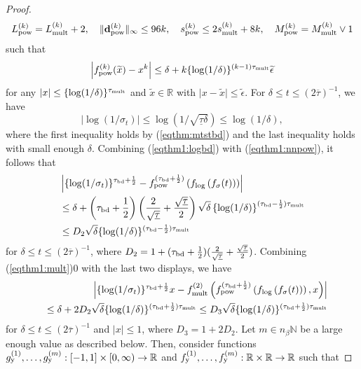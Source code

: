 \documentclass[twoside,11pt]{article}
\newcommand{\bd}{{\bf d}}
\newcommand{\bbR}{{\mathbb R}}
\newcommand{\bbN}{{\mathbb N}}
\newcommand{\be}{\begin{equation}}
\newcommand{\ee}{\end{equation}}
\newcommand{\bean}{\setlength\arraycolsep{1pt}\begin{eqnarray*}}
\newcommand{\eean}{\end{eqnarray*}}
\begin{document}
\begin{proof}
\bean
L_{\rm pow}^{(k)} =  L_{\rm mult}^{(k)} +2, \quad \| \bd_{\rm pow}^{(k)}\|_{\infty} \leq 96k, \quad s_{\rm pow}^{(k)} \leq 2s_{\rm mult}^{(k)} + 8k, \quad M_{\rm pow}^{(k)} =  M_{\rm mult}^{(k)} \vee 1
\eean
such that
\be
\left\vert f_{\rm pow}^{(k)}(\widetilde x) - x^{k} \right\vert \leq \delta + k \{ \log (1/\delta)\}^{(k-1)\tau_{\rm mult}}\widetilde \epsilon
\label{eqthm1:nnpow}
\ee
for any $\vert x \vert \leq \{\log (1/\delta)\}^{\tau_{\rm mult}}$ and $\widetilde x \in \bbR$ with $\vert x - \widetilde x \vert \leq \widetilde \epsilon$.
For $\delta \leq t \leq (2\overline{\tau})^{-1}$, we have
\be
\vert \log (1/\sigma_{t}) \vert \leq \log (1/\sqrt{\underline{\tau} \delta}) \leq \log(1/\delta), \label{eqthm1:logstbd}
\ee
where the first inequality holds by (\ref{eqthm:mtstbd}) and the last inequality holds with small enough $\delta$.
Combining (\ref{eqthm1:logbd}) with (\ref{eqthm1:nnpow}), it follows that
\be \begin{split}
& \left\vert \{ \log(1/\sigma_t)\}^{\tau_{\rm bd}+\frac{1}{2}} -   f_{\rm pow}^{(\tau_{\rm bd}+\frac{1}{2})} \left( f_{\log} \left( f_{\sigma}(t) \right) \right) \right\vert
\\
& \leq \delta + \left(\tau_{\rm bd}+\frac{1}{2} \right)\left(\frac{2}{\sqrt{\underline{\tau}}} + \frac{\sqrt{\underline{\tau}}}{2}   \right) \sqrt{\delta} \left\{ \log(1/\delta) \right\}^{(\tau_{\rm bd}-\frac{1}{2} )\tau_{\rm mult}} 
\\
& \leq D_{2} \sqrt{\delta} \{ \log(1/\delta) \}^{(\tau_{\rm bd}-\frac{1}{2} )\tau_{\rm mult}} \label{eqthm1:nnwj1}
\end{split} \ee
for $\delta \leq t \leq (2\overline{\tau})^{-1}$, where $D_{2} =1 + (\tau_{\rm bd}+\frac{1}{2} )(\frac{2}{\sqrt{\underline{\tau}}} + \frac{\sqrt{\underline{\tau}}}{2}  )$.
Combining (\ref{eqthm1:mult})0 with the last two displays, we have
\bean
&& \left\vert \{ \log(1/\sigma_t)\}^{\tau_{\rm bd}+\frac{1}{2}} x -   f_{\rm mult}^{(2)}\left( f_{\rm pow}^{(\tau_{\rm bd}+\frac{1}{2})} \left( f_{\log} \left( f_{\sigma}(t) \right) \right), x \right) \right\vert 
\\
&& \leq \delta + 2 D_{2} \sqrt{\delta}  \{\log (1/\delta)\}^{(\tau_{\rm bd}+\frac{1}{2} )\tau_{\rm mult}} \leq D_{3} \sqrt{\delta}  \{\log (1/\delta)\}^{(\tau_{\rm bd}+\frac{1}{2} )\tau_{\rm mult}}
\eean
for $\delta \leq  t \leq (2\overline{\tau})^{-1}$ and $\vert x \vert \leq 1$, where $D_{3} = 1+2D_{2}$.
Let $m \in {n_{\beta}} \bbN$ be a large enough value as described below.
Then, consider functions $g_{\rm y}^{(1)},\ldots,g_{\rm y}^{(m)} : [-1,1] \times [0,\infty) \to \bbR$ and $ f_{\rm y}^{(1)},\ldots,f_{\rm y}^{(m)} : \bbR \times \bbR \to \bbR$  such that

\end{proof}
\end{document}
